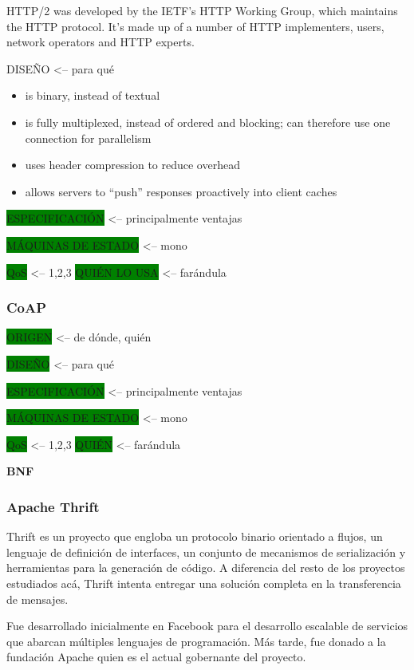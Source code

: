HTTP/2 was developed by the IETF’s HTTP Working Group, which maintains the HTTP protocol. It’s made up of a number of HTTP implementers, users, network operators and HTTP experts.

DISEÑO <-- para qué
\begin{itemize}
  \item is binary, instead of textual
  \item is fully multiplexed, instead of ordered and blocking; can therefore use one connection for parallelism
  \item uses header compression to reduce overhead
  \item allows servers to “push” responses proactively into client caches
\end{itemize}

\colorbox{green}{ESPECIFICACIÓN} <-- principalmente ventajas

\colorbox{green}{MÁQUINAS DE ESTADO} <-- mono

\colorbox{green}{QoS} <-- 1,2,3
\colorbox{green}{QUIÉN LO USA} <-- farándula

\subsubsection{CoAP}
\colorbox{green}{ORIGEN} <-- de dónde, quién

\colorbox{green}{DISEÑO} <-- para qué

\colorbox{green}{ESPECIFICACIÓN} <-- principalmente ventajas

\colorbox{green}{MÁQUINAS DE ESTADO} <-- mono

\colorbox{green}{QoS} <-- 1,2,3
\colorbox{green}{QUIÉN} <-- farándula

\textbf{BNF}



\subsubsection{Apache Thrift}

Thrift es un proyecto que engloba un protocolo binario orientado a flujos, un lenguaje de definición de interfaces, un conjunto de mecanismos de serialización y herramientas para la generación de código. A diferencia del resto de los proyectos estudiados acá, Thrift intenta entregar una solución completa en la transferencia de mensajes.

Fue desarrollado inicialmente en Facebook para el desarrollo escalable de servicios que abarcan múltiples lenguajes de programación. Más tarde, fue donado a la fundación Apache quien es el actual gobernante del proyecto.

